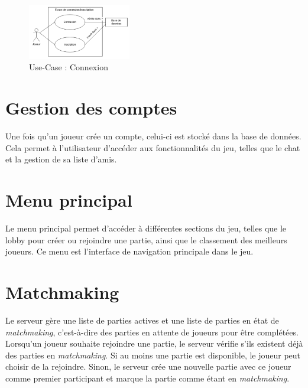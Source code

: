 \documentclass{report}
\begin{document}
\vspace{-1em}

\begin{figure}[H]
    \centering
     \includegraphics[width=0.4\textwidth, keepaspectratio]{src/design/connexion_design.png}
    \caption{Use-Case : Connexion}
    \label{fig:use_case_connexion_design}
\end{figure}

\section{Gestion des comptes}

\noindent Une fois qu’un joueur crée un compte, celui-ci est stocké dans la base de données. Cela permet à l'utilisateur d'accéder aux fonctionnalités du jeu, telles que le chat et la gestion de sa liste d'amis.



\section{Menu principal}

\noindent Le menu principal permet d'accéder à différentes sections du jeu, telles que le lobby pour créer ou rejoindre une partie, ainsi que le classement des meilleurs joueurs. Ce menu est l'interface de navigation principale dans le jeu.

\section{Matchmaking}

\noindent Le serveur gère une liste de parties actives et une liste de parties en état de \emph{matchmaking}, c’est-à-dire des parties en attente de joueurs pour être complétées. Lorsqu'un joueur souhaite rejoindre une partie, le serveur vérifie s'ils existent déjà des parties en \emph{matchmaking}. Si au moins une partie est disponible, le joueur peut choisir de la rejoindre. Sinon, le serveur crée une nouvelle partie avec ce joueur comme premier participant et marque la partie comme étant en \emph{matchmaking}.
\end{document}
